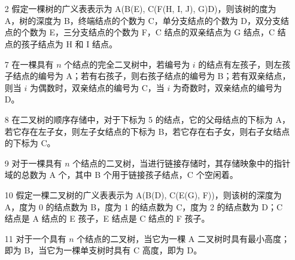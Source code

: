\documentclass[UTF8]{ctexart}
\begin{document}
\section{}
\begin{enumerate}
\item[2] 假定一棵树的广义表表示为 A(B(E), C(F(H, I, J), G)D)，则该树的度为 A，树的深度为 B，终端结点的个数为 C，单分支结点的个数为 D，双分支结点的个数为 E，三分支结点的个数为 F，C 结点的双亲结点为 G 结点，C 结点的孩子结点为 H 和 I 结点。

\item[7] 在一棵具有 $n$ 个结点的完全二叉树中，若编号为 $i$ 的结点有左孩子，则左孩子结点的编号为 A；若有右孩子，则右孩子结点的编号为 B；若有双亲结点，则当 $i$ 为偶数时，双亲结点的编号为 C，当 $i$ 为奇数时，双亲结点的编号为 D。

\item[8] 在二叉树的顺序存储中，对于下标为 5 的结点，它的父母结点的下标为 A，若它存在左子女，则左子女结点的下标为 B，若它存在右子女，则右子女结点的下标为 C。

\item[9] 对于一棵具有 $n$ 个结点的二叉树，当进行链接存储时，其存储映象中的指针域的总数为 A 个，其中 B 个用于链接孩子结点，C 个空闲着。

\item[10] 假定一棵二叉树的广义表表示为 A(B(D), C(E(G), F))，则该树的深度为 A，度为 0 的结点数为 B，度为 1 的结点数为 C，度为 2 的结点数为 D；C 结点是 A 结点的 E 孩子，E 结点是 C 结点的 F 孩子。

\item[11] 对于一个具有 $n$ 个结点的二叉树，当它为一棵 A 二叉树时具有最小高度；即为 B，当它为一棵单支树时具有 C 高度，即为 D。

\end{enumerate}
\end{document}
